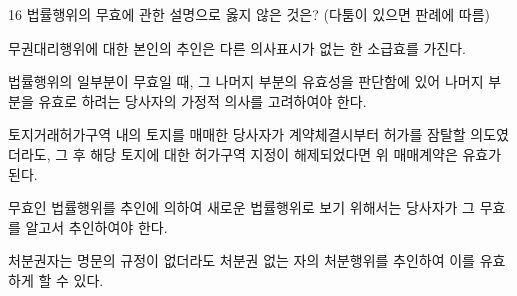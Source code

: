 \begin{question}{16}
법률행위의 무효에 관한 설명으로 옳지 않은 것은? (다툼이 있으면 판례에 따름)
\begin{choices}
  \item 무권대리행위에 대한 본인의 추인은 다른 의사표시가 없는 한 소급효를 가진다.
  \item 법률행위의 일부분이 무효일 때, 그 나머지 부분의 유효성을 판단함에 있어 나머지 부분을 유효로 하려는 당사자의 가정적 의사를 고려하여야 한다.
  \item 토지거래허가구역 내의 토지를 매매한 당사자가 계약체결시부터 허가를 잠탈할 의도였더라도, 그 후 해당 토지에 대한 허가구역 지정이 해제되었다면 위 매매계약은 유효가 된다.
  \item 무효인 법률행위를 추인에 의하여 새로운 법률행위로 보기 위해서는 당사자가 그 무효를 알고서 추인하여야 한다.
  \item 처분권자는 명문의 규정이 없더라도 처분권 없는 자의 처분행위를 추인하여 이를 유효하게 할 수 있다.
\end{choices}
\end{question}
